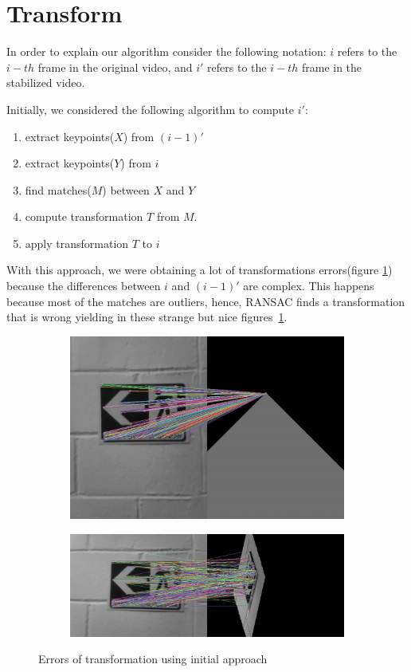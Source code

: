 \section{Transform}

In order to explain our algorithm consider the following notation: $i$ refers to the $i-th$ frame in the original video, and $i'$ refers to the $i-th$ frame in the stabilized video.

Initially, we considered the following algorithm to compute $i'$:
\begin{enumerate}
	\item extract keypoints($X$) from $(i-1)'$
	\item extract keypoints($Y$) from $i$
	\item find matches($M$) between $X$ and $Y$
	\item compute transformation $T$ from $M$.
	\item apply transformation $T$ to $i$
\end{enumerate}

With this approach, we were obtaining a lot of transformations errors(figure \ref{fig:misstransformations}) because the differences between $i$ and $(i-1)'$ are complex. This happens because most of the matches are outliers, hence, RANSAC finds a transformation that is wrong yielding in these strange but nice figures~\ref{fig:misstransformations}. 

\begin{figure}[!h]
	\centering
	\begin{subfigure}{0.4\textwidth}
	  \centering
	  \includegraphics[width=0.9\linewidth]{figs/mistrans01.jpg}
	\end{subfigure}%
	\begin{subfigure}{0.6\textwidth}
	  \centering
	  \includegraphics[width=0.9\linewidth]{figs/mistrans02.jpg}
	\end{subfigure}%
	 \caption{Errors of transformation using initial approach}
	\label{fig:misstransformations}
\end{figure}

